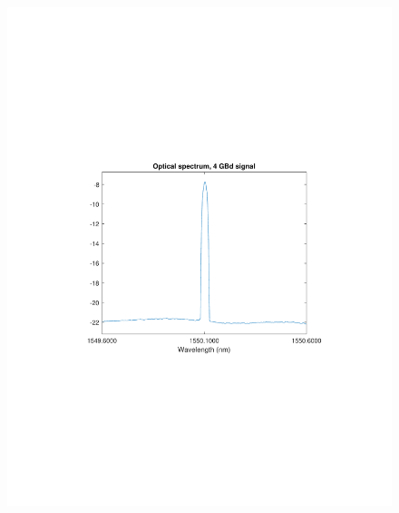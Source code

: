 \begin{refsection}
\begin{figure}[H]
	\centering
	\begin{minipage}{0.43\textwidth}
		\centering
		\includegraphics[clip, trim=4cm 8cm 4cm 8cm, width=1\textwidth]{./sdf/m_qam_system/figures/expResults/4GBdOSASpectrum.pdf}
		\label{fig:4GBdOptiSpect}
	\end{minipage}
	\begin{minipage}{0.43\textwidth}
		\centering

\end{minipage}
\end{figure}
\end{refsection}

